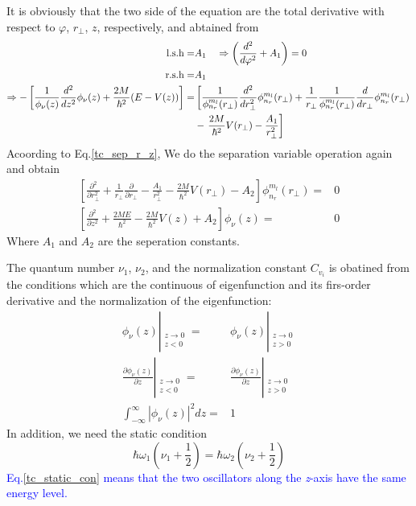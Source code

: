   It is obviously that the two side of the equation are the total derivative with respect to $\varphi$, $r_\perp$, $z$, respectively, and abtained from 
  \begin{align}
    \text{l.s.h} =& A_1 \quad \Rightarrow \left(\frac{d^2}{d\varphi^2} + A_1 \right) = 0  \\
    \text{r.s.h} =& A_1 \\
    \Rightarrow -\left[ \frac{1}{\phi_\nu(z)}\frac{d^2}{dz^2}\phi_{\nu}(z) + \frac{2M}{\hbar^2}(E - V(z)) \right] =& \left[  \frac{1}{\phi_{n_r}^{m_l}(r_\perp)} \frac{d^2}{d r_\perp^2} \phi_{n_r}^{m_l}(r_\perp)  + \frac{1}{r_\perp} \frac{1}{\phi_{n_r}^{m_l}(r_\perp)}\frac{d}{d r_\perp}\phi_{n_r}^{m_l}(r_\perp) \right. \label{tc_sep_r_z} \\
    & - \left. \frac{2M}{\hbar^2} V(r_\perp) - \frac{A_1}{r_\perp^2} \right] \notag
  \end{align}
  Acoording to Eq.\eqref{tc_sep_r_z}, We do the separation variable operation again and obtain
  \begin{equation}
    \begin{aligned}
      \left[\frac{\partial^{2}}{\partial r_{\perp}^{2}}+\frac{1}{r_{\perp}} \frac{\partial}{\partial r_{\perp}}-\frac{A_{1}}{r_{\perp}^{2}}-\frac{2 M}{\hbar^{2}} V\left(r_{\perp}\right)-A_{2}\right] \phi_{n_{r}}^{m_{l}}\left(r_{\perp}\right)=& 0 \\
      \left[\frac{\partial^{2}}{\partial z^{2}}+\frac{2 M E}{\hbar^{2}}-\frac{2 M}{\hbar^{2}} V(z)+A_{2}\right] \phi_{\nu}(z)=& 0
    \end{aligned}
  \end{equation}
  Where $A_1$ and $A_2$ are the seperation constants.

  The quantum number $\nu_1$, $\nu_2$, and the normalization constant $C_{v_i}$ is obatined from the conditions which are the continuous of eigenfunction and its firs-order derivative and the normalization of the eigenfunction:
  \begin{align}
    \phi_{\nu}(z)\left|_{\substack{z \rightarrow 0 \\ z<0}}\right. =& \phi_{\nu}(z)\left|_{\substack{z \rightarrow 0 \\ z>0}} \right.  \label{tc_wave_con}\\
    \frac{\partial\phi_\nu(z)}{\partial z} \left|_{\substack{z \rightarrow 0 \\ z< 0}} \right. =& \frac{\partial\phi_\nu(z)}{\partial z} \left|_{\substack{z \rightarrow 0 \\ z > 0}} \right. \label{tc_wave_one_order_con} \\  
    \int_{-\infty}^{\infty} \left| \phi_\nu(z) \right| ^2 dz =& 1 \label{tc_wave_norm}
  \end{align}
  In addition, we need the static condition
  \begin{equation}
    \hbar\omega_1(\nu_1 + \frac{1}{2}) = \hbar\omega_2(\nu_2 + \frac{1}{2}) \label{tc_static_con}
  \end{equation}
  \textcolor{blue}{Eq.\eqref{tc_static_con} means that the two oscillators along the \textit{z}-axis have the same energy level.}

